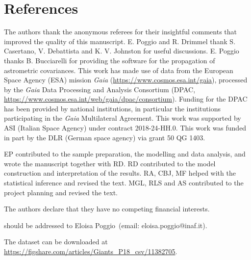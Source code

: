 \documentclass{nature}
\begin{document}
%


\newpage

\section*{References}










\begin{addendum}
 \item The authors thank the anonymous referees for their insightful comments that improved the quality of this manuscript. E. Poggio and R. Drimmel thank S. Casertano, V. Debattista and K. V. Johnston for useful discussions. E. Poggio thanks B. Bucciarelli for providing the software for the propagation of astrometric covariances. This work has made use of data from the European Space Agency (ESA) mission
{\it Gaia} (\url{https://www.cosmos.esa.int/gaia}), processed by the {\it Gaia}
Data Processing and Analysis Consortium (DPAC,
\url{https://www.cosmos.esa.int/web/gaia/dpac/consortium}). Funding for the DPAC
has been provided by national institutions, in particular the institutions
participating in the {\it Gaia} Multilateral Agreement. This work was supported by ASI (Italian Space Agency) under contract 2018-24-HH.0. This work was funded in part by the DLR (German space agency) via grant 50 QG 1403.
\item[Author contributions] EP contributed to the sample preparation, the modelling and data analysis, and wrote the manuscript together with RD. RD contributed to the model construction and interpretation of the results. RA, CBJ, MF helped with the statistical inference and revised the text. MGL, RLS and AS contributed to the project planning and revised the text.
 \item[Competing Interests] The authors declare that they have no competing financial interests.
 \item[Correspondence and request for materials] should be addressed to Eloisa Poggio~(email: eloisa.poggio@inaf.it). 
 \item[Data availability] The dataset can be downloaded at \url{https://figshare.com/articles/Giants_P18_csv/11382705}.
\end{addendum}

\end{document}
